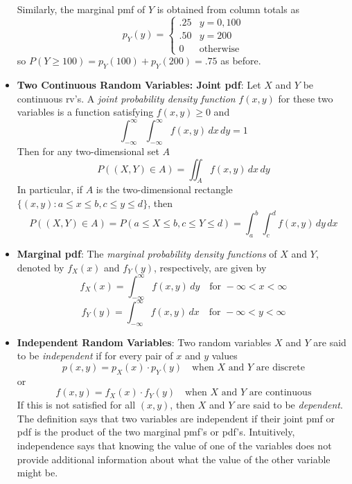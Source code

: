 \documentclass{report}
\begin{document}
\begin{itemize}
\[            \]
            Similarly, the marginal pmf of \( Y \) is obtained from column totals as
            \[
                p_Y(y) = 
                \begin{cases}
                    .25 & y = 0, 100 \\
                    .50 & y = 200 \\
                    0 & \text{otherwise}
                \end{cases}
            \]
            so \( P(Y \ge 100) = p_Y(100) + p_Y(200) = .75 \) as before.
        \item \textbf{Two Continuous Random Variables: Joint pdf}:
            Let \( X \) and \( Y \) be continuous rv’s. A \textit{joint probability density function} \( f(x, y) \) for these two variables is a function satisfying \( f(x, y) \geq 0 \) and
            \[
                \int_{-\infty}^{\infty} \int_{-\infty}^{\infty} f(x, y) \, dx \, dy = 1
            \]
            Then for any two-dimensional set \( A \)
            \[
                P((X, Y) \in A) = \iint_A f(x, y) \, dx \, dy
            \]
            In particular, if \( A \) is the two-dimensional rectangle \(\{(x, y): a \leq x \leq b, c \leq y \leq d\}\), then
            \[
                P((X, Y) \in A) = P(a \leq X \leq b, c \leq Y \leq d) = \int_a^b \int_c^d f(x, y) \, dy \, dx
            \]
        \item \textbf{Marginal pdf}:
            The \textit{marginal probability density functions} of \(X\) and \(Y\), denoted by \(f_X(x)\) and \(f_Y(y)\), respectively, are given by
            \[
                f_X(x) = \int_{-\infty}^{\infty} f(x, y) \, dy \quad \text{for } -\infty < x < \infty
            \]
            \[
                f_Y(y) = \int_{-\infty}^{\infty} f(x, y) \, dx \quad \text{for } -\infty < y < \infty
            \]
        \item \textbf{Independent Random Variables}:
            Two random variables \( X \) and \( Y \) are said to be \textit{independent} if for every pair of \( x \) and \( y \) values
            \[
                p(x, y) = p_X(x) \cdot p_Y(y) \quad \text{when } X \text{ and } Y \text{ are discrete}
            \]
            or
            \[
                f(x, y) = f_X(x) \cdot f_Y(y) \quad \text{when } X \text{ and } Y \text{ are continuous}
            \]
            If this is not satisfied for all \((x, y)\), then \( X \) and \( Y \) are said to be \textit{dependent}.
            \bigbreak \noindent 
            The definition says that two variables are independent if their joint pmf or pdf is the
            product of the two marginal pmf’s or pdf’s. Intuitively, independence says that
            knowing the value of one of the variables does not provide additional information
            about what the value of the other variable might be.


\end{itemize}
\end{document}
